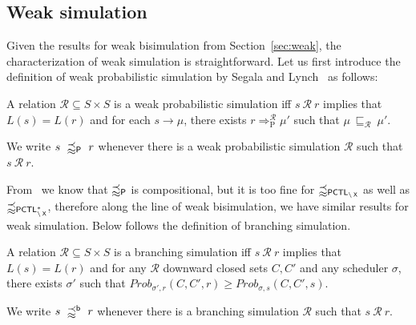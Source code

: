 \documentclass{LMCS}
\DeclareMathOperator{\X}{\text{\sf X}}
\newcommand{\TRAN}[2]{#1\rightarrow #2}
\newcommand{\PCTL}{{\sf PCTL}}
\newcommand{\bSiP}{\precapprox_{{\sf P}}}
\newcommand{\MC}[1]{\mathcal{#1}}
\newcommand{\DSI}[1][\MC{R}]{\sqsubseteq_{#1}}
\newcommand{\SEPCTLWN}{\precapprox_{\PCTL_{\backslash\X}}}
\newcommand{\SEPCTLSWN}{\precapprox_{\PCTL^{*}_{\backslash\X}}}
\newcommand{\WBSi}{\precapprox^{{\sf b}}}
\newcommand{\bTRANP}[2]{#1\Rightarrow^{\MC{R}}_{\text{P}}#2}
\newcommand{\MEASURE}{\mathit{Prob}}
\begin{document}
\subsection{Weak simulation}
Given the results for weak bisimulation from Section~\ref{sec:weak}, the characterization of weak simulation is straightforward.
Let us first introduce the definition of weak probabilistic simulation by Segala and Lynch~\cite{SegalaL95} as follows:
\begin{defi}\label{def:branching simulation}
A relation $\MC{R}\subseteq S\times S$ is a weak probabilistic simulation iff $s~\MC{R}~r$ implies that $L(s)=L(r)$ and for each $\TRAN{s}{\mu}$, there exists $\bTRANP{r}{\mu'}$ such that $\mu~\DSI~\mu'$.

We write $s~\bSiP~r$ whenever there is a weak probabilistic simulation $\MC{R}$ such that $s~\MC{R}~r$.
\end{defi}

\noindent From~\cite{SegalaL95} we know that $\bSiP$ is compositional, but it is too fine for $\SEPCTLWN$ as well as $\SEPCTLSWN$, therefore along the line of weak bisimulation, we have similar results for weak simulation. Below follows the definition of  branching simulation.

\begin{defi}\label{def:weak simulation branching}
A relation $\MC{R}\subseteq S\times S$ is a branching simulation iff $s~\MC{R}~r$ implies that $L(s)=L(r)$ and for any $\MC{R}$ downward closed sets $C,C'$ and any scheduler $\sigma$, there exists $\sigma'$ such that $\MEASURE_{\sigma',r}(C,C',r)\geq\MEASURE_{\sigma,s}(C,C',s)$.

We write $s~\WBSi~r$ whenever there is a branching simulation $\MC{R}$ such that $s~\MC{R}~r$.
\end{defi}
\end{document}
